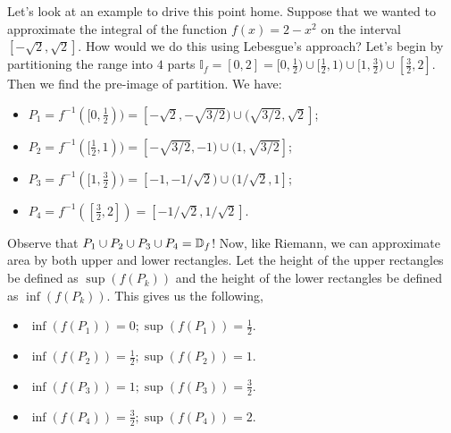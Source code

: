 \documentclass{article}
\theoremstyle{axiom} \newtheorem{axiom}{Axiom}
\theoremstyle{definition} \newtheorem{definition}{Definition}
\theoremstyle{example} \newtheorem{example}{Example}
\theoremstyle{proposition} \newtheorem{prop}{Proposition}
\theoremstyle{lemma} \newtheorem{lemma}{Lemma}
\newcommand{\I}{\mathbb{I}}  \newcommand{\J}{\mathbb{K}}
\begin{document}
Let's look at an example to drive this point home. Suppose that we wanted to
approximate the integral of the function $f(x) = 2-x^2$ on the interval
$[-\sqrt{2},\sqrt{2}]$. How would we do this using Lebesgue's approach?
Let's begin by partitioning the range into $4$ parts $\I_f = [0,2] =
[0,\frac{1}{2}) \cup [\frac{1}{2},1) \cup [1,\frac{3}{2}) \cup [\frac{3}{2},2]$.
Then we find the pre-image of partition. We have:
\begin{itemize}
	\item 
	$P_1 = f^{-1}([0,\frac{1}{2})) = [-\sqrt{2},-\sqrt{3/2} ) \cup (\sqrt{3/2},\sqrt{2}]$;
	\item 
	$P_2 = f^{-1}([\frac{1}{2},1))= [-\sqrt{3/2},-1) \cup (1,\sqrt{3/2}]$;
	\item 
	$P_3 = f^{-1}([1,\frac{3}{2})) = [-1,-1/\sqrt{2}) \cup (1/\sqrt{2},1]$;
	\item 
	$P_4 = f^{-1}([\frac{3}{2},2])= [-1/\sqrt{2},1/\sqrt{2}]$.
\end{itemize}

Observe that $P_1 \cup P_2 \cup P_3 \cup P_4 = \mathbb{D}_f$!
Now, like Riemann, we can approximate area by both upper and lower rectangles. 
Let the height of the upper rectangles be defined as $\sup(f(P_k))$ and the 
height of the lower rectangles be defined as $\inf(f(P_k))$. This gives
us the following,
\begin{itemize}
	\item $\inf(f(P_1)) = 0; \sup(f(P_1)) = \frac{1}{2}$.
	\item $\inf(f(P_2)) = \frac{1}{2}; \sup(f(P_2)) = 1$.
	\item $\inf(f(P_3)) = 1; \sup(f(P_3)) = \frac{3}{2}$.
	\item $\inf(f(P_4)) = \frac{3}{2}; \sup(f(P_4)) = 2$.
\end{itemize}
\end{document}
